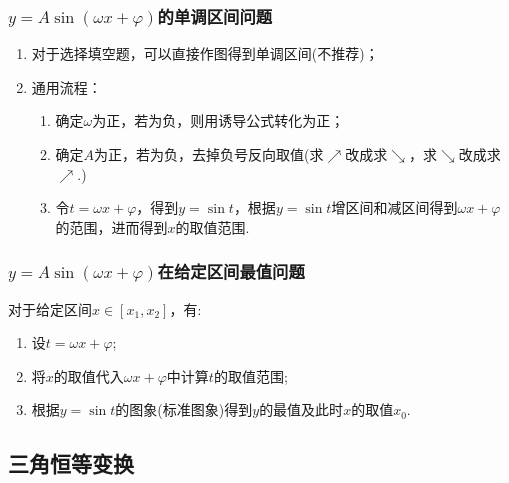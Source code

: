 \documentclass{BHCexam}
\begin{document}
\subsubsection{$y=A\sin\left(\omega x+\varphi\right)$的单调区间问题}
\begin{enumerate}[1)]
\item 对于选择填空题，可以直接作图得到单调区间(不推荐)；
\item 通用流程：\begin{enumerate}[1)]
\item 确定$ \omega $为正，若为负，则用诱导公式转化为正；
\item 确定$ A $为正，若为负，去掉负号反向取值(求$\nearrow$改成求$ \searrow $，求$ \searrow $改成求$ \nearrow $.)
\item 令$ t=\omega x+\varphi $，得到$ y=\sin t $，根据$ y=\sin t $增区间和减区间得到$ \omega x+\varphi $的范围，进而得到$ x $的取值范围.
\end{enumerate}
\end{enumerate}
\subsubsection{$y=A\sin\left(\omega x+\varphi\right)$在给定区间最值问题}\label{123}
对于给定区间$ x\in\left[x_1,x_2\right] $，有:
\begin{enumerate}
\item 设$ t=\omega x+\varphi $;
\item 将$ x $的取值代入$ \omega x+\varphi $中计算$ t$的取值范围;
\item 根据$ y=\sin t $的图象(标准图象)得到$ y $的最值及此时$ x $的取值$ x_0 $.
\end{enumerate}
\subsection{三角恒等变换}
\end{document}
